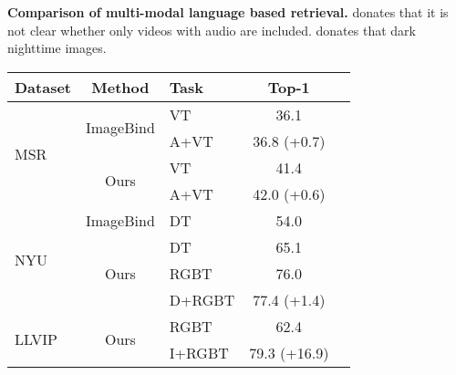 \documentclass{article} \usepackage{iclr2024_conference,times}
\begin{document}
\begin{minipage}{\textwidth}

\begin{minipage}[t]{0.47\textwidth}
\makeatletter{}

\small
\setlength\tabcolsep{1.5mm}
\caption{\textbf{Comparison of multi-modal language based retrieval.}  donates that it is not clear whether only videos with audio are included.  donates that dark nighttime images.}
\label{tab:mm_lang_ret}
\centering
\begin{tabular}{l|clcc}
\toprule
    \textbf{Dataset}  & \textbf{Method} & \textbf{Task}  & \textbf{Top-1} \\
    \midrule
    \multirow{4}{*}{MSR}  & \multirow{2}{*}{ImageBind} & VT  & 36.1 \\
      &  & A+VT  & 36.8 \tiny{(+0.7)} \\
      \cmidrule(r){3-4}
      & \multirow{2}{*}{Ours} & VT  & 41.4 \\
      &  & A+VT  & 42.0 \tiny{(+0.6)} \\
    \midrule
    \multirow{4}{*}{NYU}  & ImageBind & DT  & 54.0 \\
      \cmidrule(r){3-4}
      & \multirow{3}{*}{Ours} & DT & 65.1 \\
      &  & RGBT  & 76.0 \\
      &  & D+RGBT & 77.4 \tiny{(+1.4)} \\
    \midrule
    \multirow{2}{*}{LLVIP}  & \multirow{2}{*}{Ours} & RGBT & 62.4 \\
      &  & I+RGBT & 79.3 \tiny{(+16.9)} \\
\bottomrule
\end{tabular}






%
 \label{sample-table}
\end{minipage}
\hfill
\begin{minipage}[t]{0.51\textwidth}
\makeatletter{}












\end{minipage}
\end{minipage}
\end{document}
